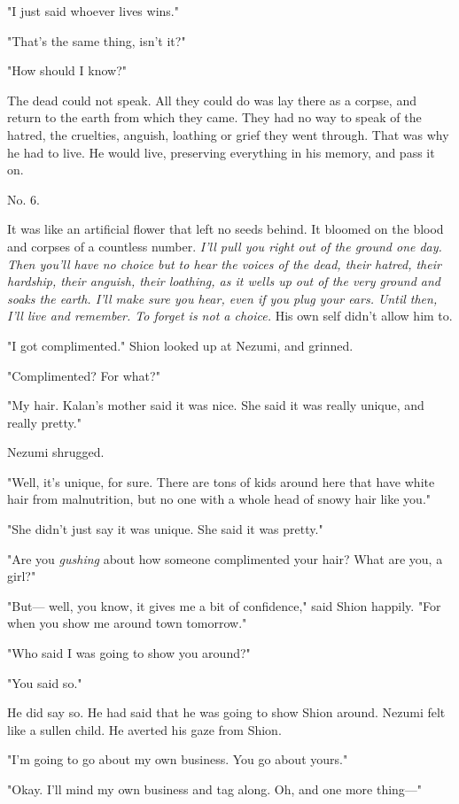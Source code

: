 "I just said whoever lives wins."

"That's the same thing, isn't it?"

"How should I know?"

The dead could not speak. All they could do was lay there as a corpse,
and return to the earth from which they came. They had no way to speak
of the hatred, the cruelties, anguish, loathing or grief they went
through. That was why he had to live. He would live, preserving
everything in his memory, and pass it on.

No. 6.~

It was like an artificial flower that left no seeds behind. It bloomed
on the blood and corpses of a countless number. \emph{I'll pull you right out
of the ground one day. Then you'll have no choice but to hear the voices
of the dead, their hatred, their hardship, their anguish, their
loathing, as it wells up out of the very ground and soaks the earth.
I'll make sure you hear, even if you plug your ears. Until then, I'll
live and remember. To forget is not a choice.} His own self didn't allow
him to.

"I got complimented." Shion looked up at Nezumi, and grinned.

"Complimented? For what?"

"My hair. Kalan's mother said it was nice. She said it was really
unique, and really pretty."

Nezumi shrugged.

"Well, it's unique, for sure. There are tons of kids around here that
have white hair from malnutrition, but no one with a whole head of snowy
hair like you."

"She didn't just say it was unique. She said it was pretty."

"Are you \emph{gushing} about how someone complimented your hair? What are you,
a girl?"

"But--- well, you know, it gives me a bit of confidence," said Shion
happily. "For when you show me around town tomorrow."

"Who said I was going to show you around?"

"You said so."

He did say so. He had said that he was going to show Shion around.
Nezumi felt like a sullen child. He averted his gaze from Shion.

"I'm going to go about my own business. You go about yours."

"Okay. I'll mind my own business and tag along. Oh, and one more thing---"

